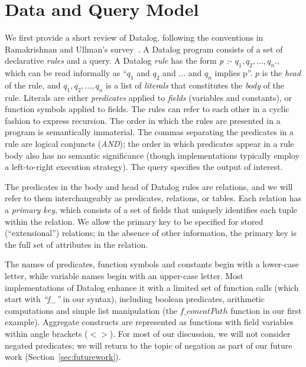 
\section{Data and Query Model}
\label{sec:queryModel}

We first provide a short review of Datalog, following the conventions
in Ramakrishnan and Ullman's survey~\cite{ramakrishnan93survey}. A 
Datalog program consists of a set of declarative {\em rules} and a
query. A Datalog {\em rule} has the form {\em p :- 
$q_{1}, q_{2}, ..., q_{n}$}., which can be read informally as
``$q_{1}$ and $q_{2}$ and $ ... $ and $q_{n}$ implies p''. $p$ is the {\em head} of the
rule, and $q_{1}, q_{2}, ..., q_{n}$ is a list of {\em literals} that
constitutes the {\em body} of the rule.  Literals are either {\em
predicates} applied to {\em fields} (variables and constants), or
function symbols applied to fields. The rules can refer to each other
in a cyclic fashion to express recursion. The order in which the rules
are presented in a program is semantically immaterial.  The commas
separating the predicates in a rule are logical conjuncts ({\em AND});
the order in which predicates appear in a rule body also has no
semantic significance (though implementations typically employ a
left-to-right execution strategy). The query
specifies the output of interest. 

The predicates in the body and head of Datalog rules are relations,
and we will refer to them interchangeably as predicates, relations, or
tables.  Each relation has a {\em primary key}, which consists of a
set of fields that uniquely identifies each tuple within the
relation. We allow the primary key to be specified for stored
(``extensional'') relations; in the absence of other information, the
primary key is the full set of attributes in the relation. 

The names of predicates, function symbols
and constants begin with a lower-case letter,
while variable names begin with an upper-case letter.  Most
implementations of Datalog enhance it with a limited set of function
calls (which start with {\em ``f\_''} in our syntax), including
boolean predicates, arithmetic computations and simple list
manipulation (\eg the $f\_concatPath$ function in our first
example). Aggregate constructs are represented as functions with field
variables within angle brackets ($<>$). For most of our discussion, we
will not consider negated predicates; we will return to the topic of
negation as part of our future work (Section~\ref{sec:futurework}).

